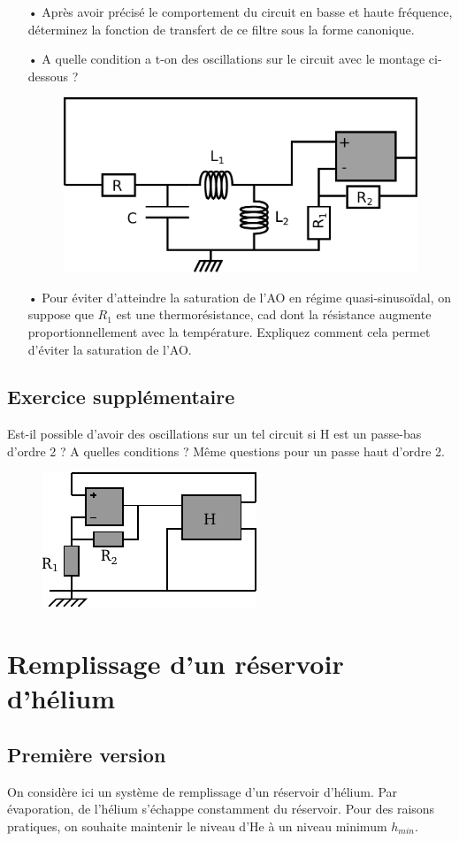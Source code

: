 \documentclass{report}
\begin{document}
\begin{itemize}
	\item[•]  Après avoir précisé le comportement du circuit en basse et haute fréquence, déterminez la fonction de transfert de ce filtre sous la forme canonique.
	\item[•] A quelle condition a t-on des oscillations sur le circuit avec le montage ci-dessous ?
	
	\begin{figure}[!h]
\centering
\includegraphics[width=0.4\linewidth]{resonnateur2.pdf}
\end{figure}

	\item[•] Pour éviter d'atteindre la saturation de l'AO en régime quasi-sinusoïdal, on suppose que $R_1$ est une thermorésistance, cad dont la résistance augmente proportionnellement avec la température. Expliquez comment cela permet d'éviter la saturation de l'AO.

\end{itemize}




\subsection*{Exercice supplémentaire}
Est-il possible d'avoir des oscillations sur un tel circuit si H est un passe-bas d'ordre 2 ? A quelles conditions ? 
Même questions pour un passe haut d'ordre 2.
\begin{figure}[!h]
\centering
\includegraphics[width=0.3\linewidth]{circuit_9.pdf}
\end{figure}

\newpage

\section*{Remplissage d'un réservoir d'hélium}
\subsection*{Première version}
On considère ici un système de remplissage d'un réservoir d'hélium. Par évaporation, de l'hélium s'échappe constamment du réservoir. Pour des raisons pratiques, on souhaite maintenir le niveau d'He à un niveau minimum $h_{min}$.
\end{document}
